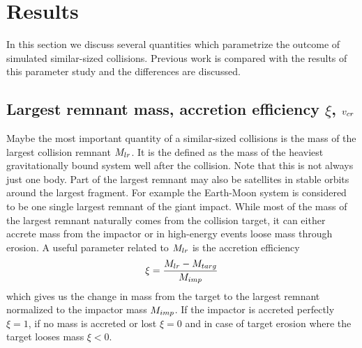 \section{Results}
In this section we discuss several quantities which parametrize the outcome of simulated similar-sized collisions. Previous work is compared with the results of this parameter study and the differences are discussed. 
\subsection{Largest remnant mass, accretion efficiency $\xi$, $v_{cr}$}
Maybe the most important quantity of a similar-sized collisions is the mass of the largest collision remnant $M_{lr}$. It is the defined as the mass of the heaviest gravitationally bound system well after the collision. Note that this is not always just one body. Part of the largest remnant may also be satellites in stable orbits around the largest fragment. For example the Earth-Moon system is considered to be one single largest remnant of the giant impact. While most of the mass of the largest remnant naturally comes from the collision target, it can either accrete mass from the impactor or in high-energy events loose mass through erosion. A useful parameter related to $M_{lr}$ is the accretion efficiency
\begin{equation}
\xi = \frac{M_{lr} - M_{targ}}{M_{imp}}
\end{equation}
which gives us the change in mass from the target to the largest remnant normalized to the impactor mass $M_{imp}$. If the impactor is accreted perfectly $\xi = 1$, if no mass is accreted or lost $\xi = 0$ and in case of target erosion where the target looses mass $\xi < 0$.

